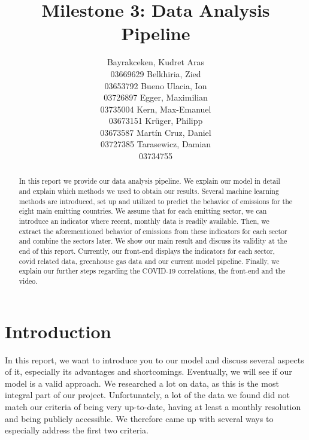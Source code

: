\documentclass{article}
\title{Milestone 3: Data Analysis Pipeline}
\author{Bayrakceken, Kudret Aras\\
	03669629
	\And
	Belkhiria, Zied\\
	03653792
	\And
	Bueno Ulacia, Ion\\
	03726897
	\And
	Egger, Maximilian\\
	03735004
	\And
	Kern, Max-Emanuel\\
	03673151
	\And
	Krüger, Philipp \\
	03673587
	\And
	Martín Cruz, Daniel\\
	03727385
	\And
	Tarasewicz, Damian\\
	03734755
}
\newcommand{\co}{\text{CO\textsubscript{2} }}
\begin{document}
\maketitle
\begin{abstract}
In this report we provide our data analysis pipeline. We explain our model in detail and explain which methods we used to obtain our results. Several machine learning methods are introduced, set up and utilized to predict the behavior of \co emissions for the eight main \co emitting countries.  We assume that for each \co emitting sector, we can introduce an indicator where recent, monthly data is readily available. Then, we extract the aforementioned behavior of \co emissions from these indicators for each sector and combine the sectors later. We show our main result and discuss its validity at the end of this report. Currently, our front-end displays the indicators for each sector, covid related data, greenhouse gas data and our current model pipeline. Finally, we explain our further steps regarding the COVID-19 correlations, the front-end and the video.
\end{abstract}




\tableofcontents

%

\newpage
\section{Introduction}

In this report, we want to introduce you to our model and discuss several aspects of it, especially its advantages and shortcomings. Eventually, we will see if our model is a valid approach. We researched a lot on data, as this is the most integral part of our project. Unfortunately, a lot of the data we found did not match our criteria of being very up-to-date, having at least a monthly resolution and being publicly accessible. We therefore came up with several ways to especially address the first two criteria.
\end{document}
